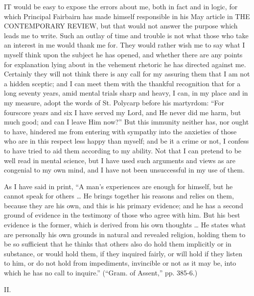 
IT would be easy to expose the errors
about me, both in fact and in logic, for which Principal Fairbairn has
made himself responsible in his May article in THE
CONTEMPORARY REVIEW, but
that would not answer the purpose which leads me to write. Such an
outlay of time and trouble is not what those who take an interest in
me would thank me for. They would rather wish me to say what I myself
think upon the subject he has opened, and whether there are any points
for explanation lying about in the vehement rhetoric he has directed
against me. Certainly they will not think there is any call for my
assuring them that I am not a hidden sceptic; and I can meet them with
the thankful recognition that for a long seventy years, amid mental
trials sharp and heavy, I can, in my place and in my measure, adopt
the words of St. Polycarp before his martyrdom: ``For fourscore
years and six I have served my Lord, and He never did me harm, but
much good; and can I leave Him now?'' But this immunity neither
has, nor ought to have, hindered me from entering with sympathy into
the anxieties of those who are in this respect less happy than myself;
and be it a crime or not, I confess to have tried to aid them
according to my ability. Not that I can pretend to be well read in
mental science, but I have used such arguments and views as are
congenial to my own mind, and I have not been unsuccessful in my use
of them.

As I have said in print, ``A man's experiences are enough for
himself, but he cannot speak for others … He brings together his
reasons and relies on them, because they are his own, and this is his
primary evidence; and he has a second ground of evidence in the
testimony of those who agree with him. But his best evidence is the
former, which is derived from his own thoughts … He states
what are personally his own grounds in natural and revealed religion,
holding them to be so sufficient that he thinks that others also do
hold them implicitly or in substance, or would hold them, if they
inquired fairly, or will hold if they listen to him, or do not hold
from impediments, invincible or not as it may be, into which he has no
call to inquire.'' (``Gram. of Assent,'' pp. 385-6.)

II.

